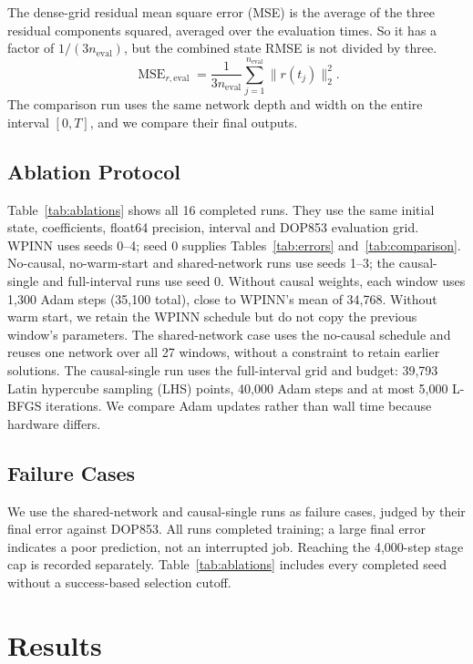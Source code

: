 \documentclass[conference,a4paper]{IEEEtran}
\begin{document}
The dense-grid residual mean square error (MSE) is the average of the three residual components squared, averaged over the evaluation times. So it has a factor of $1/(3n_{\mathrm{eval}})$, but the combined state RMSE is not divided by three.
\[
\operatorname{MSE}_{r,\mathrm{eval}}
=\frac{1}{3n_{\mathrm{eval}}}\sum_{j=1}^{n_{\mathrm{eval}}}\|r(t_j)\|_2^2.
\]
 The comparison run uses the same network depth and width on the entire interval $[0,T]$, and we compare their final outputs.

\subsection{Ablation Protocol}
Table~\ref{tab:ablations} shows all 16 completed runs. They use the same initial state, coefficients, float64 precision, interval and DOP853 evaluation grid. WPINN uses seeds 0--4; seed 0 supplies Tables~\ref{tab:errors} and~\ref{tab:comparison}. No-causal, no-warm-start and shared-network runs use seeds 1--3; the causal-single and full-interval runs use seed 0. Without causal weights, each window uses 1,300 Adam steps (35,100 total), close to WPINN's mean of 34,768. Without warm start, we retain the WPINN schedule but do not copy the previous window's parameters. The shared-network case uses the no-causal schedule and reuses one network over all 27 windows, without a constraint to retain earlier solutions. The causal-single run uses the full-interval grid and budget: 39,793 Latin hypercube sampling (LHS) points, 40,000 Adam steps and at most 5,000 L-BFGS iterations. We compare Adam updates rather than wall time because hardware differs.

\subsection{Failure Cases}
We use the shared-network and causal-single runs as failure cases, judged by their final error against DOP853. All runs completed training; a large final error indicates a poor prediction, not an interrupted job. Reaching the 4,000-step stage cap is recorded separately. Table~\ref{tab:ablations} includes every completed seed without a success-based selection cutoff.


\section{Results}
\label{sec:results}
\end{document}
